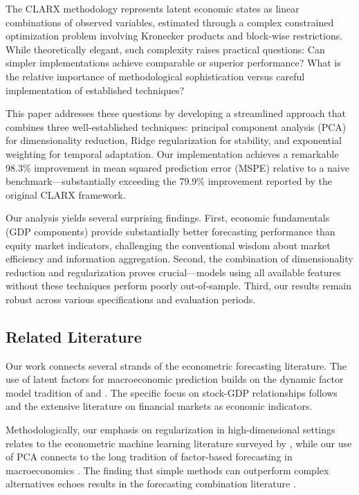 \documentclass[11pt,letterpaper]{article}
\theoremstyle{plain}
\theoremstyle{definition}
\theoremstyle{remark}
\begin{document}
The CLARX methodology represents latent economic states as linear combinations of observed variables, estimated through a complex constrained optimization problem involving Kronecker products and block-wise restrictions. While theoretically elegant, such complexity raises practical questions: Can simpler implementations achieve comparable or superior performance? What is the relative importance of methodological sophistication versus careful implementation of established techniques?

This paper addresses these questions by developing a streamlined approach that combines three well-established techniques: principal component analysis (PCA) for dimensionality reduction, Ridge regularization for stability, and exponential weighting for temporal adaptation. Our implementation achieves a remarkable 98.3\% improvement in mean squared prediction error (MSPE) relative to a naive benchmark—substantially exceeding the 79.9\% improvement reported by the original CLARX framework.

Our analysis yields several surprising findings. First, economic fundamentals (GDP components) provide substantially better forecasting performance than equity market indicators, challenging the conventional wisdom about market efficiency and information aggregation. Second, the combination of dimensionality reduction and regularization proves crucial—models using all available features without these techniques perform poorly out-of-sample. Third, our results remain robust across various specifications and evaluation periods.

\subsection{Related Literature}

Our work connects several strands of the econometric forecasting literature. The use of latent factors for macroeconomic prediction builds on the dynamic factor model tradition of \citet{stock2002forecasting} and \citet{stock2002macroeconomic}. The specific focus on stock-GDP relationships follows \citet{ball2021} and the extensive literature on financial markets as economic indicators.

Methodologically, our emphasis on regularization in high-dimensional settings relates to the econometric machine learning literature surveyed by \citet{mullainathan2017}, while our use of PCA connects to the long tradition of factor-based forecasting in macroeconomics \citep{bai2003}. The finding that simple methods can outperform complex alternatives echoes results in the forecasting combination literature \citep{timmermann2006}.
\end{document}
